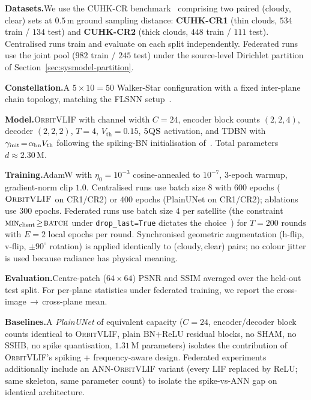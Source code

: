 \documentclass[conference]{IEEEtran}
\newcommand{\OrbitVLIF}{\textsc{OrbitVLIF}}
\newcommand{\SSHB}{\textsc{SSHB}}
\newcommand{\SHAM}{\textsc{SHAM}}
\newcommand{\FQS}{\textsc{5QS}}
\begin{document}
\textbf{Datasets.}\;\;We use the CUHK-CR
benchmark~\cite{ref:cuhkcr} comprising two paired
\mbox{(cloudy,\,clear)} sets at $0.5$\,m ground sampling distance:
\textbf{CUHK-CR1} (thin clouds, $534$ train / $134$ test) and
\textbf{CUHK-CR2} (thick clouds, $448$ train / $111$ test).
Centralised runs train and evaluate on each split independently.
Federated runs use the joint pool ($982$ train / $245$ test) under
the source-level Dirichlet partition of
Section~\ref{sec:sysmodel-partition}.

\textbf{Constellation.}\;\;A $5\!\times\!10\!=\!50$ Walker-Star
configuration with a fixed inter-plane chain topology, matching the
FLSNN setup~\cite{ref:flsnn}.

\textbf{Model.}\;\;\OrbitVLIF{} with channel width $C\!=\!24$,
encoder block counts $(2,2,4)$, decoder $(2,2,2)$, $T\!=\!4$,
$V_\textrm{th}\!=\!0.15$, $\FQS$ activation, and TDBN with
$\gamma_{\rm init}\!=\!\alpha_{\rm bn}V_\textrm{th}$ following the
spiking-BN initialisation of~\cite{ref:flsnn}. Total parameters
$d\!\approx\!2.30$\,M.

\textbf{Training.}\;\;AdamW with $\eta_0\!=\!10^{-3}$ cosine-annealed
to $10^{-7}$, $3$-epoch warmup, gradient-norm clip $1.0$. Centralised
runs use batch size $8$ with $600$ epochs ($\OrbitVLIF$ on CR1/CR2)
or $400$ epochs (PlainUNet on CR1/CR2); ablations use $300$ epochs.
Federated runs use batch size $4$ per satellite (the constraint
$\textsc{min}_\textrm{client}\!\geq\!\textsc{batch}$
under \texttt{drop\_last=True} dictates the
choice~\cite{ref:fedbn}) for $T\!=\!200$ rounds with $E\!=\!2$
local epochs per round. Synchronised geometric augmentation
(h-flip, v-flip, $\pm 90^\circ$ rotation) is applied identically
to (cloudy,\,clear) pairs; no colour jitter is used because radiance
has physical meaning.

\textbf{Evaluation.}\;\;Centre-patch ($64\!\times\!64$)
PSNR and SSIM averaged over the held-out test split. For per-plane
statistics under federated training, we report the
cross-image\,$\to$\,cross-plane mean.

\textbf{Baselines.}\;\;A \emph{PlainUNet} of equivalent capacity
($C\!=\!24$, encoder/decoder block counts identical to \OrbitVLIF,
plain BN+ReLU residual blocks, no \SHAM, no \SSHB, no spike
quantisation, $1.31$\,M parameters) isolates the contribution of
\OrbitVLIF's spiking + frequency-aware design. Federated experiments
additionally include an ANN-\OrbitVLIF{} variant (every LIF
replaced by ReLU; same skeleton, same parameter count) to isolate
the spike-vs-ANN gap on identical architecture.
\end{document}
